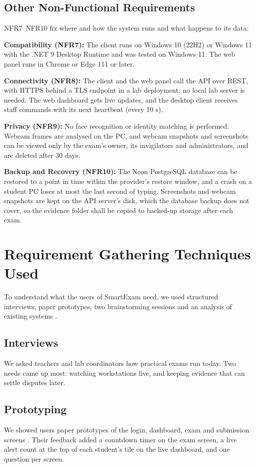 \subsection{Other Non-Functional Requirements}
\label{sec:othernfr}
NFR7--NFR10 fix where and how the system runs and what happens to its data:

\textbf{Compatibility (NFR7):} The client runs on Windows 10 (22H2) or Windows 11 with the .NET 9 Desktop Runtime and was tested on Windows 11. The web panel runs in Chrome or Edge 111 or later.

\textbf{Connectivity (NFR8):} The client and the web panel call the API over REST, with HTTPS behind a TLS endpoint in a lab deployment; no local lab server is needed. The web dashboard gets live updates, and the desktop client receives staff commands with its next heartbeat (every 10 s).

\textbf{Privacy (NFR9):} No face recognition or identity matching is performed. Webcam frames are analysed on the PC, and webcam snapshots and screenshots can be viewed only by the exam's owner, its invigilators and administrators, and are deleted after 30 days.

\textbf{Backup and Recovery (NFR10):} The Neon PostgreSQL database can be restored to a point in time within the provider's restore window, and a crash on a student PC loses at most the last second of typing. Screenshots and webcam snapshots are kept on the API server's disk, which the database backup does not cover, so the evidence folder shall be copied to backed-up storage after each exam.

\section{Requirement Gathering Techniques Used}
\label{sec:gathering}
To understand what the users of SmartExam need, we used structured interviews, paper prototypes, two brainstorming sessions and an analysis of existing systems \cite{elicit1, sommerville}.

\subsection{Interviews}
We asked teachers and lab coordinators how practical exams run today. Two needs came up most: watching workstations live, and keeping evidence that can settle disputes later.

\subsection{Prototyping}
We showed users paper prototypes of the login, dashboard, exam and submission screens \cite{sommerville}. Their feedback added a countdown timer on the exam screen, a live alert count at the top of each student's tile on the live dashboard, and one question per screen.


